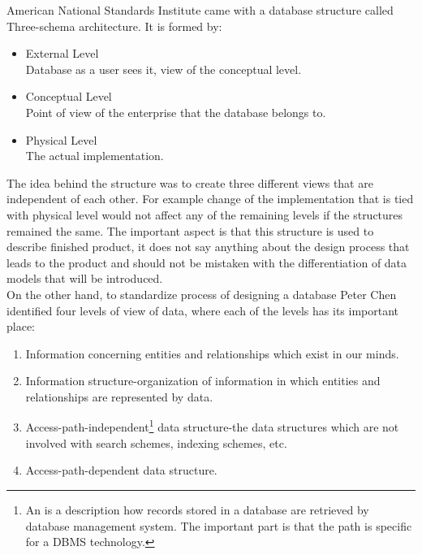 American National Standards Institute \cite{ANSIArchitecture75} came with a database structure called Three-schema architecture. It is formed by:
\begin{itemize}
	\item External Level \\ Database as a user sees it, view of the conceptual level. 
	\item Conceptual Level \\ Point of view of the enterprise that the database belongs to.
	\item Physical Level \\ The actual implementation.
\end{itemize}

The idea behind the structure was to create three different views that are independent of each other. 
For example change of the implementation that is tied with physical level would not affect any of the remaining levels if the structures remained the same. 
The important aspect is that this structure is used to describe finished product, it does not say anything about the design process that leads to the product and should not be mistaken with the differentiation of data models that will be introduced.\\

On the other hand, to standardize process of designing a database Peter Chen\cite{Chen76theentity-relationship} identified four levels of view of data, where each of the levels has its important place: \\
\begin{enumerate}
	\item Information concerning entities and relationships which exist in our minds.
	\item Information structure-organization of information in which entities and relationships are represented by data.
	\item Access-path-independent\footnote{An  is a description how records stored in a database are retrieved by database management system\cite{AccessPathDefiniton}. The important part is that the path is specific for a DBMS technology.} data structure-the data structures which are not involved with search schemes, indexing schemes, etc.
	\item Access-path-dependent data structure.
\end{enumerate}

